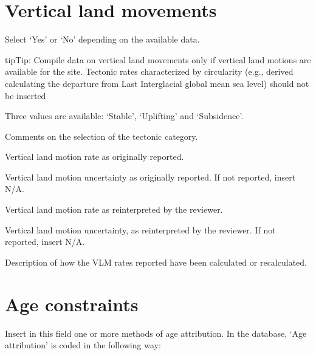 \documentclass[letterpaper,10pt,english]{sphinxmanual}
\begin{document}
\section{Vertical land movements}
\label{\detokenize{RSL_data:vertical-land-movements}}
 \sphinxhyphen{} Select ‘Yes’ or ‘No’ depending on the available data.

\begin{sphinxadmonition}{tip}{Tip:}
Compile data on vertical land movements only if  vertical land motions are available for the site. Tectonic rates characterized by circularity (e.g., derived calculating the departure from Last Interglacial global mean sea level) should not be inserted
\end{sphinxadmonition}

 \sphinxhyphen{} Three values are available: ‘Stable’, ‘Uplifting’ and ‘Subsidence’.

 \sphinxhyphen{} Comments on the selection of the tectonic category.

 \sphinxhyphen{} Vertical land motion rate as originally reported.

 \sphinxhyphen{} Vertical land motion uncertainty as originally reported. If not reported, insert N/A.

 \sphinxhyphen{} Vertical land motion rate as re\sphinxhyphen{}interpreted by the reviewer.

 \sphinxhyphen{} Vertical land motion uncertainty, as re\sphinxhyphen{}interpreted by the reviewer. If not reported, insert N/A.

 \sphinxhyphen{} Description of how the VLM rates reported have been calculated or re\sphinxhyphen{}calculated.


\section{Age constraints}
\label{\detokenize{RSL_data:age-constraints}}
 \sphinxhyphen{} Insert in this field one or more methods of age attribution. In the database, ‘Age attribution’ is coded in the following way:
\end{document}
